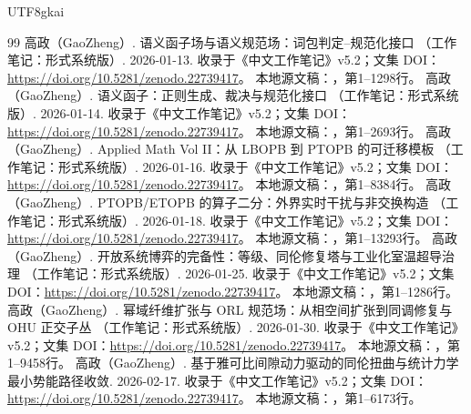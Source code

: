 \documentclass[11pt,a4paper]{article}
\theoremstyle{plain}
\theoremstyle{definition}
\theoremstyle{remark}
\begin{document}
\begin{CJK*}{UTF8}{gkai}
\begin{thebibliography}{99}
高政（GaoZheng）. 语义函子场与语义规范场：词包判定--规范化接口 （工作笔记：形式系统版）. 2026-01-13.
\newblock 收录于《中文工作笔记》v5.2；文集 DOI：\url{https://doi.org/10.5281/zenodo.22739417}。
\newblock 本地源文稿：，第1--1298行。
高政（GaoZheng）. 语义函子：正则生成、裁决与规范化接口 （工作笔记：形式系统版）. 2026-01-14.
\newblock 收录于《中文工作笔记》v5.2；文集 DOI：\url{https://doi.org/10.5281/zenodo.22739417}。
\newblock 本地源文稿：，第1--2693行。
高政（GaoZheng）. Applied Math Vol II：从 LBOPB 到 PTOPB 的可迁移模板 （工作笔记：形式系统版）. 2026-01-16.
\newblock 收录于《中文工作笔记》v5.2；文集 DOI：\url{https://doi.org/10.5281/zenodo.22739417}。
\newblock 本地源文稿：，第1--8384行。
高政（GaoZheng）. PTOPB/ETOPB 的算子二分：外界实时干扰与非交换构造 （工作笔记：形式系统版）. 2026-01-18.
\newblock 收录于《中文工作笔记》v5.2；文集 DOI：\url{https://doi.org/10.5281/zenodo.22739417}。
\newblock 本地源文稿：，第1--13293行。
高政（GaoZheng）. 开放系统博弈的完备性：等级、同伦修复塔与工业化室温超导治理 （工作笔记：形式系统版）. 2026-01-25.
\newblock 收录于《中文工作笔记》v5.2；文集 DOI：\url{https://doi.org/10.5281/zenodo.22739417}。
\newblock 本地源文稿：，第1--1286行。
高政（GaoZheng）. 幂域纤维扩张与 ORL 规范场：从相空间扩张到同调修复与 OHU 正交子丛 （工作笔记：形式系统版）. 2026-01-30.
\newblock 收录于《中文工作笔记》v5.2；文集 DOI：\url{https://doi.org/10.5281/zenodo.22739417}。
\newblock 本地源文稿：，第1--9458行。
高政（GaoZheng）. 基于雅可比间隙动力驱动的同伦扭曲与统计力学最小势能路径收敛. 2026-02-17.
\newblock 收录于《中文工作笔记》v5.2；文集 DOI：\url{https://doi.org/10.5281/zenodo.22739417}。
\newblock 本地源文稿：，第1--6173行。

\end{thebibliography}
\end{CJK*}
\end{document}

